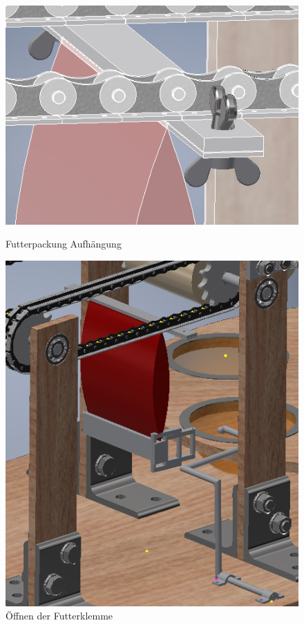 \begin{figure}[H]
   \begin{minipage}[hbt]{.4\linewidth} %
      \includegraphics[width=\linewidth]{Bilder/Inventor/Fluegelmutter_Ansicht}
      \caption{Futterpackung Aufhängung}
      \label{Futterpackung_Aufhaengung_Inventor} 
   \end{minipage}
   \hspace{.1\linewidth}%
   \begin{minipage}[hbt]{.4\linewidth} %
      \includegraphics[width=\linewidth]{Bilder/Inventor/Futterpackung_Ansicht}
      \caption{Öffnen der Futterklemme}
      \label{Oeffnen_Futterpackung_Inventor}
   \end{minipage}
\end{figure}

